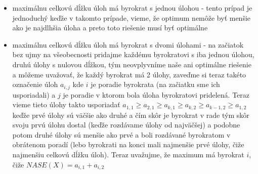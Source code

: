 \documentclass[a4paper]{article}
\begin{document}
\begin{itemize}
	\item maximálnu celkovú dĺžku úloh má byrokrat s jednou úlohou - tento prípad je jednoduchý keďže v takomto prípade, vieme, že optimum nemôže byť menšie ako je najdlhšia úloha a preto toto riešenie musí byť optimálne
	\item maximálnu celkovú dĺžku úloh má byrokrat s dvomi úlohami - na začiatok bez ujmy na všeobecnosti pridajme každému byrokratovi s iba jednou úlohou, druhú úlohy s nulovou dĺžkou, tým neovplyvníme naše ani optimálne riešenie a môžeme uvažovať, že každý byrokrat má 2 úlohy, zaveďme si teraz takéto označenie úloh $a_{i,j}$ kde $i$ je poradie byrokrata (na začiatku sme ich usporiadali) a $j$ je poradie v ktorom bola úloha byrokratovi pridelená. Teraz vieme tieto úlohy takto usporiadať $a_{1,1} \geq a_{2,1} \geq a_{k, 1} \geq a_{k, 2} \geq a_{k-1, 2} \geq a_{1,2}$ keďže prvé úlohy sú väčšie ako druhé a čím skôr je byrokrat v rade tým skôr svoju prvú úlohu dostal (keďže rozdávame úlohy od najväčšej) a podobne potom druhé úlohy sú menšie ako prvé a boli rozdávané byrokratom v obrátenom poradí (lebo byrokrati na konci mali najmenšie prvé úlohy, čiže najmenšiu celkovú dĺžku úloh). Teraz uvažujme, že maximum má byrokrat $i$, čiže $NASE(X) = a_{i, 1} + a_{i, 2}$ 
\end{itemize} 
\end{document}
